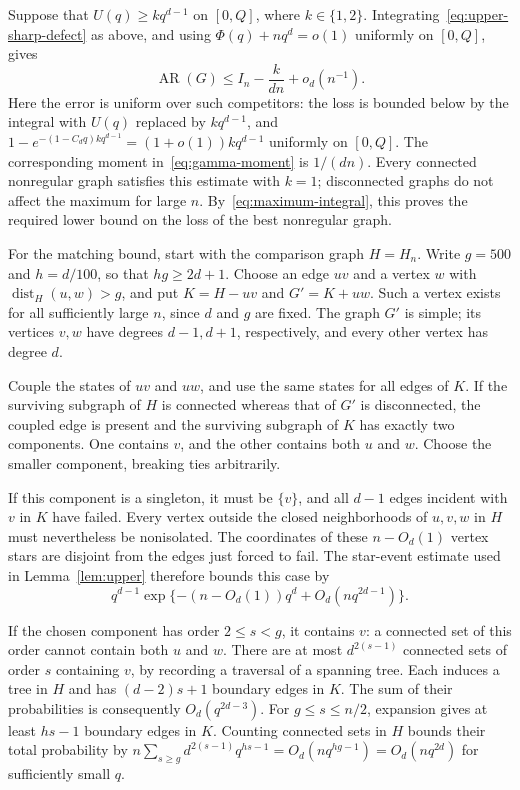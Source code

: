 \documentclass[11pt,reqno]{amsart}
\theoremstyle{remark}
\numberwithin{equation}{section}
\newcommand{\AR}{\operatorname{AR}}
\begin{document}
Suppose that $U(q)\ge kq^{d-1}$ on $[0,Q]$, where $k\in\{1,2\}$.
Integrating~\eqref{eq:upper-sharp-defect} as above,
and using $\Phi(q)+nq^d=o(1)$ uniformly on $[0,Q]$, gives
\begin{equation}\label{eq:k-defects}
 \AR(G)\le I_n-\frac{k}{dn}+o_d(n^{-1}).
\end{equation}
Here the error is uniform over such competitors: the loss is bounded
below by the integral with $U(q)$ replaced by $kq^{d-1}$, and
$1-e^{-(1-C_dq)kq^{d-1}}=(1+o(1))kq^{d-1}$ uniformly on $[0,Q]$.
The corresponding moment in~\eqref{eq:gamma-moment} is $1/(dn)$.
Every connected nonregular graph satisfies this estimate with $k=1$;
disconnected graphs do not affect the maximum for large $n$.
By~\eqref{eq:maximum-integral}, this proves the required lower bound
on the loss of the best nonregular graph.

For the matching bound, start with the comparison graph $H=H_n$.
Write $g=500$ and $h=d/100$, so that $hg\ge2d+1$.
Choose an edge $uv$ and a vertex $w$ with
$\operatorname{dist}_H(u,w)>g$, and put
$K=H-uv$ and $G'=K+uw$.
Such a vertex exists for all sufficiently large $n$, since $d$ and $g$
are fixed. The graph $G'$ is simple; its vertices $v,w$ have degrees
$d-1,d+1$, respectively, and every other vertex has degree $d$.

Couple the states of $uv$ and $uw$, and use the same states for all
edges of $K$. If the surviving subgraph of $H$ is connected whereas
that of $G'$ is disconnected, the coupled edge is present and the
surviving subgraph of $K$ has exactly two components. One contains $v$,
and the other contains both $u$ and $w$.
Choose the smaller component, breaking ties arbitrarily.

If this component is a singleton, it must be $\{v\}$, and all $d-1$
edges incident with $v$ in $K$ have failed. Every vertex outside the
closed neighborhoods of $u,v,w$ in $H$ must nevertheless be nonisolated.
The coordinates of these $n-O_d(1)$ vertex stars are disjoint from
the edges just forced to fail. The star-event estimate used in
Lemma~\ref{lem:upper} therefore bounds this case by
\begin{equation}\label{eq:singleton-transfer}
 q^{d-1}\exp\{-(n-O_d(1))q^d+O_d(nq^{2d-1})\}.
\end{equation}

If the chosen component has order $2\le s<g$, it contains $v$:
a connected set of this order cannot contain both $u$ and $w$.
There are at most $d^{2(s-1)}$ connected sets of order $s$ containing
$v$, by recording a traversal of a spanning tree.
Each induces a tree in $H$ and has $(d-2)s+1$ boundary edges in $K$.
The sum of their probabilities is consequently $O_d(q^{2d-3})$.
For $g\le s\le n/2$, expansion gives at least $hs-1$ boundary edges
in $K$. Counting connected sets in $H$ bounds their total probability
by
$n\sum_{s\ge g}d^{2(s-1)}q^{hs-1}=O_d(nq^{hg-1})
=O_d(nq^{2d})$ for sufficiently small $q$.
\end{document}
